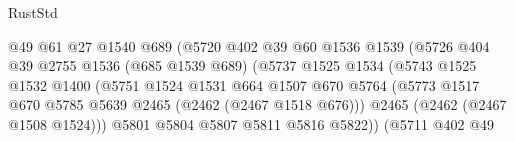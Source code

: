 \begin{lexlean}{RustStd}
\begin{coremodule}
                                        @49
                                        @61
                                        @27
                                        @1540
                                        @689
                                        (@5720
                                          @402
                                          @39
                                          @60
                                          @1536
                                          @1539
                                          (@5726
                                            @404
                                            @39
                                            @2755
                                            @1536
                                            (@685 @1539 @689)
                                            (@5737
                                              @1525
                                              @1534
                                              (@5743
                                                @1525
                                                @1532
                                                @1400
                                                (@5751
                                                  @1524
                                                  @1531
                                                  @664
                                                  @1507
                                                  @670
                                                  @5764
                                                  (@5773
                                                    @1517
                                                    @670
                                                    @5785
                                                    @5639
                                                    @2465
                                                    (@2462 (@2467 @1518 @676)))
                                                  @2465
                                                  (@2462 (@2467 @1508 @1524)))
                                                @5801
                                                @5804
                                                @5807
                                                @5811
                                                @5816
                                                @5822))
                                            (@5711
                                              @402
                                              @49

\end{coremodule}
\end{lexlean}
